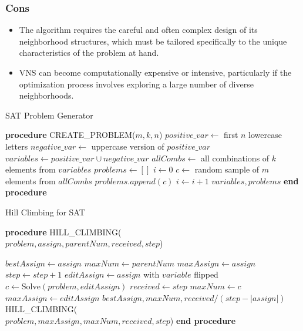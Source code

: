 \documentclass[conference]{IEEEtran}
\begin{document}
\subsubsection{Cons}
\begin{itemize}
    \item The algorithm requires the careful and often complex design of its neighborhood structures, which must be tailored specifically to the unique characteristics of the problem at hand.
    \item VNS can become computationally expensive or intensive, particularly if the optimization process involves exploring a large number of diverse neighborhoods.
\end{itemize}
\begin{algorithm}
\caption{SAT Problem Generator}
\begin{algorithmic}[1]
\STATE \textbf{procedure} CREATE\_PROBLEM($m, k, n$)
\STATE $positive\_var \leftarrow$ first $n$ lowercase letters
\STATE $negative\_var \leftarrow$ uppercase version of $positive\_var$
\STATE $variables \leftarrow positive\_var \cup negative\_var$
\STATE $allCombs \leftarrow$ all combinations of $k$ elements from $variables$
\STATE $problems \leftarrow []$
\STATE $i \leftarrow 0$
    \STATE $c \leftarrow$ random sample of $m$ elements from $allCombs$
        \STATE $problems.append(c)$
        \STATE $i \leftarrow i + 1$
    \ENDIF
\ENDWHILE
\RETURN $variables, problems$
\STATE \textbf{end procedure}
\end{algorithmic}
\end{algorithm}

\begin{algorithm}
\caption{Hill Climbing for SAT}
\begin{algorithmic}[1]
\STATE \textbf{procedure} HILL\_CLIMBING(\\
\hspace{1.2em}$problem, assign, parentNum, received, step$)

\STATE $bestAssign \leftarrow assign$
\STATE $maxNum \leftarrow parentNum$
\STATE $maxAssign \leftarrow assign$
    \STATE $step \leftarrow step + 1$
    \STATE $editAssign \leftarrow assign$ with $variable$ flipped
    \STATE $c \leftarrow \text{Solve}(problem, editAssign)$
        \STATE $received \leftarrow step$
        \STATE $maxNum \leftarrow c$
        \STATE $maxAssign \leftarrow editAssign$
    \ENDIF
\ENDFOR
{}
    \RETURN $bestAssign, maxNum, received / (step - |assign|)$
\ELSE
    \RETURN HILL\_CLIMBING(\\
    
    \hspace{1.2em}$problem, maxAssign, maxNum, received, step$)
\ENDIF
\STATE \textbf{end procedure}
\end{algorithmic}
\end{algorithm}
\end{document}
